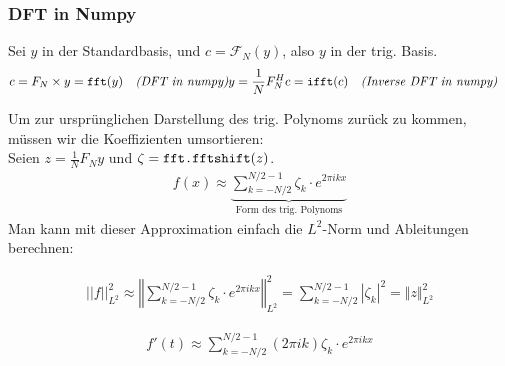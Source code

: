 \subsubsection{DFT in Numpy}

Sei $y$ in der Standardbasis, und $c = \mathcal{F}_N(y)$, also $y$ in der trig. Basis.
\begin{align*}
    c = F_N \times y = \texttt{fft}(y)\quad \text{\textit{(DFT in numpy)}} & y = \frac{1}{N}F_N^Hc = \texttt{ifft}(c)\quad \textit{(Inverse DFT in numpy)}
\end{align*}

Um zur ursprünglichen Darstellung des trig. Polynoms zurück zu kommen, müssen wir die Koeffizienten umsortieren: \\
Seien $z = \frac{1}{N} F_N y$ und  $\zeta = \verb|fft.fftshift|(z)$.
\begin{align*}
    f(x) \approx \underbrace{\sum_{k=-N/2}^{N/2-1} \zeta_k \cdot e^{2 \pi ikx} }_{\text{Form des trig. Polynoms}}
\end{align*}
\inlineremark Man kann mit dieser Approximation einfach die $L^2$-Norm und Ableitungen berechnen:
\vspace{-1.5pc}
\begin{multicols}{2}
    \begin{align*}
        ||f||^2_{L^2} \approx \left\Vert \sum_{k=-N/2}^{N/2-1} \zeta_k \cdot e^{2 \pi ikx} \right\Vert^2_{L^2} = \sum_{k=-N/2}^{N/2-1} |\zeta_k|^2 = \Vert z \Vert^2_{L^2}
    \end{align*}

    \newcolumn

    \begin{align*}
        f'(t) \approx \sum_{k=-N/2}^{N/2-1} (2\pi ik) \zeta_k \cdot e^{2 \pi ikx}
    \end{align*}
\end{multicols}
